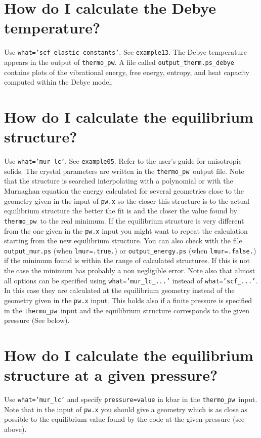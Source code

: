 \documentclass[12pt,a4paper]{article}
\def\thermo{\texttt{thermo\_pw}}
\begin{document}
\newpage
\section{\color{coral}How do I calculate the Debye temperature?}
Use \texttt{what='scf\_elastic\_constants'}. See \texttt{example13}. The
Debye temperature appears in the output of \thermo. A file called
\texttt{output\_therm.ps\_debye} contains plots of the vibrational
energy, free energy, entropy, and heat capacity computed within the 
Debye model.

\newpage
\section{\color{coral}How do I calculate the equilibrium structure?}
Use \texttt{what='mur\_lc'}. See \texttt{example05}. Refer to the user's
guide for anisotropic solids. The crystal
parameters are written in the \thermo\ output file. Note that the structure is
searched interpolating with a polynomial or with the Murnaghan
equation the energy calculated for several geometries close to the geometry 
given in the input of \texttt{pw.x} so the closer this structure is to the 
actual equilibrium structure the better the fit is and the
closer the value found by \thermo\ to the real minimum. If the 
equilibrium structure is very different from the one given in the 
\texttt{pw.x} input you might want to repeat the calculation starting 
from the new equilibrium structure. You can also check with the file
\texttt{output\_mur.ps} (when \texttt{lmur=.true.}) or 
\texttt{output\_energy.ps} (when \texttt{lmur=.false.}) if the minimum
found is within the range of calculated structures. If this is not 
the case the minimum has probably a non negligible error.
Note also that almost all options can be specified using
\texttt{what='mur\_lc\_...'} instead of \texttt{what='scf\_...'}.
In this case they are calculated at the equilibrium geometry instead of
the geometry given in the \texttt{pw.x} input. 
This holds also if a finite pressure is specified in the \thermo\ input 
and the equilibrium structure corresponds to the given pressure (See below).

\newpage
\section{\color{coral}How do I calculate the equilibrium structure 
at a given pressure?}
Use \texttt{what='mur\_lc'} and specify \texttt{pressure=value} in kbar in the
\thermo\ input. Note that in the input of \texttt{pw.x} you should 
give a geometry which is as close as possible to the equilibrium value
found by the code at the given pressure (see above).
\end{document}
